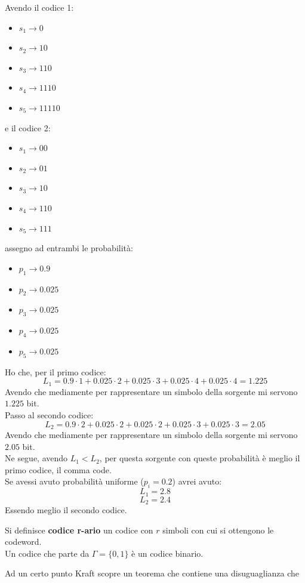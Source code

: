 \documentclass[a4paper,12pt, oneside]{book}
\begin{document}
\begin{esempio}
  Avendo il codice 1:
   \begin{itemize}
    \item $s_1\to 0$
    \item $s_2\to 10$
    \item $s_3\to 110$
    \item $s_4\to 1110$
    \item $s_5\to 11110$
  \end{itemize}
  e il codice 2:
   \begin{itemize}
    \item $s_1\to 00$
    \item $s_2\to 01$
    \item $s_3\to 10$
    \item $s_4\to 110$
    \item $s_5\to 111$
  \end{itemize}
  assegno ad entrambi le probabilità:
   \begin{itemize}
    \item $p_1\to 0.9$
    \item $p_2\to 0.025$
    \item $p_3\to 0.025$
    \item $p_4\to 0.025$
    \item $p_5\to 0.025$
  \end{itemize}
  Ho che, per il primo codice:
  \[L_1=0.9\cdot 1+0.025\cdot 2+0.025\cdot 3+0.025\cdot 4+0.025\cdot 4=1.225\]
  Avendo che mediamente per rappresentare un simbolo della sorgente mi servono
  $1.225$ bit.\\
  Passo al secondo codice:
  \[L_2=0.9\cdot 2+0.025\cdot 2+0.025\cdot 2+0.025\cdot 3+0.025\cdot 3=2.05\]
  Avendo che mediamente per rappresentare un simbolo della sorgente mi servono
  $2.05$ bit.\\
  Ne segue, avendo $L_1<L_2$, per questa sorgente con queste probabilità è
  meglio il primo codice, il comma code.\\
  Se avessi avuto probabilità uniforme ($p_i=0.2$) avrei avuto:
  \[L_1=2.8\]
  \[L_2=2.4\]
  Essendo meglio il secondo codice.
\end{esempio}
\begin{definizione}
  Si definisce \textbf{codice r-ario} un codice con $r$ simboli con cui si
  ottengono le codeword.\\
  Un codice che parte da $\Gamma=\{0,1\}$ è un codice binario.
\end{definizione}
Ad un certo punto Kraft scopre un teorema che contiene una disuguaglianza che
\end{document}
